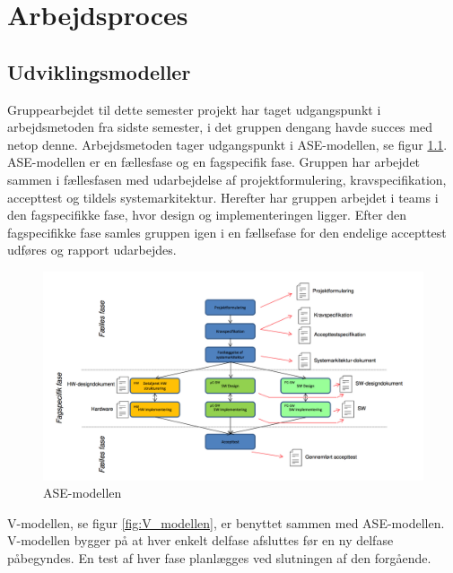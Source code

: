 
\chapter{Arbejdsproces}

\section{Udviklingsmodeller}
Gruppearbejdet til dette semester projekt har taget udgangspunkt i arbejdsmetoden fra sidste semester, i det gruppen dengang havde succes med netop denne. Arbejdsmetoden tager udgangspunkt i ASE-modellen, se figur \ref{fig:ASE_modellen}. ASE-modellen er en fællesfase og en fagspecifik fase. Gruppen har arbejdet sammen i fællesfasen med udarbejdelse af projektformulering, kravspecifikation, accepttest og tildels systemarkitektur. Herefter har gruppen arbejdet i teams i den fagspecifikke fase, hvor design og implementeringen ligger. Efter den fagspecifikke fase samles gruppen igen i en fællsefase for den endelige accepttest udføres og rapport udarbejdes. 

\begin{figure}[h]
  \centering
    \includegraphics[width=\textwidth]{Billeder/ASE_modellen}
    \caption{ASE-modellen}
    \label{fig:ASE_modellen}
\end{figure}

V-modellen, se figur \ref{fig:V_modellen}, er benyttet sammen med ASE-modellen. V-modellen bygger på at hver enkelt delfase afsluttes før en ny delfase påbegyndes. En test af hver fase planlægges ved slutningen af den forgående. 

